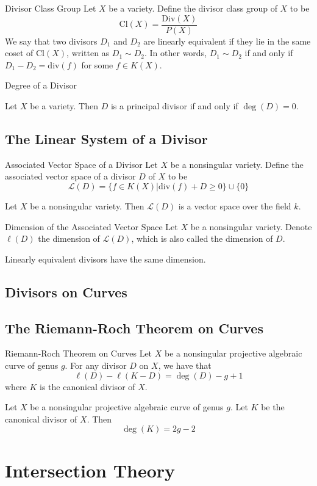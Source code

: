 \documentclass[a4paper]{article}
\begin{document}
\begin{defn}{Divisor Class Group}{} Let $X$ be a variety. Define the divisor class group of $X$ to be $$\text{Cl}(X)=\frac{\text{Div}(X)}{P(X)}$$
We say that two divisors $D_1$ and $D_2$ are linearly equivalent if they lie in the same coset of $\text{Cl}(X)$, written as $D_1\sim D_2$. In other words, $D_1\sim D_2$ if and only if $D_1-D_2=\text{div}(f)$ for some $f\in K(X)$. 
\end{defn}

\begin{defn}{Degree of a Divisor}{}
\end{defn}

\begin{prp}{}{} Let $X$ be a variety. Then $D$ is a principal divisor if and only if $\deg(D)=0$. 
\end{prp}

\subsection{The Linear System of a Divisor}
\begin{defn}{Associated Vector Space of a Divisor}{} Let $X$ be a nonsingular variety. Define the associated vector space of a divisor $D$ of $X$ to be $$\mathcal{L}(D)=\{f\in K(X)|\text{div}(f)+D\geq 0\}\cup\{0\}$$
\end{defn}

\begin{lmm}{}{} Let $X$ be a nonsingular variety. Then $\mathcal{L}(D)$ is a vector space over the field $k$. 
\end{lmm}

\begin{defn}{Dimension of the Associated Vector Space}{} Let $X$ be a nonsingular variety. Denote $\ell(D)$ the dimension of $\mathcal{L}(D)$, which is also called the dimension of $D$. 
\end{defn}

\begin{thm}{}{} Linearly equivalent divisors have the same dimension. 
\end{thm}

\subsection{Divisors on Curves}

\subsection{The Riemann-Roch Theorem on Curves}
\begin{thm}{Riemann-Roch Theorem on Curves}{} Let $X$ be a nonsingular projective algebraic curve of genus $g$. For any divisor $D$ on $X$, we have that $$\ell(D)-\ell(K-D)=\deg(D)-g+1$$ where $K$ is the canonical divisor of $X$. 
\end{thm}

\begin{lmm}{}{} Let $X$ be a nonsingular projective algebraic curve of genus $g$. Let $K$ be the canonical divisor of $X$. Then $$\deg(K)=2g-2$$
\end{lmm}

\pagebreak
\section{Intersection Theory}
\end{document}
